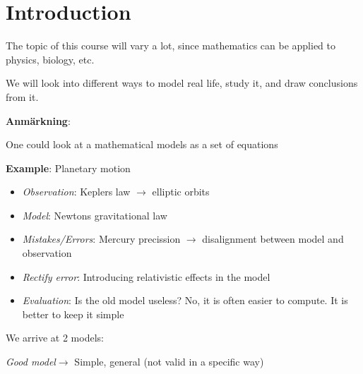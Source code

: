\section{Introduction}\par
\noindent The topic of this course will vary a lot, since mathematics can be applied to physics, biology, etc.\par
\noindent We will look into different ways to model real life, study it, and draw conclusions from it.
\par\bigskip
\noindent\textbf{Anmärkning}:\par
\noindent One could look at a mathematical models as a set of equations
\par\bigskip
\noindent\textbf{Example}: Planetary motion
\begin{itemize}
  \item\textit{Observation}: Keplers law $\rightarrow$ elliptic orbits
  \item\textit{Model}: Newtons gravitational law
  \item\textit{Mistakes/Errors}: Mercury precission $\rightarrow$ disalignment between model and observation
  \item\textit{Rectify error}: Introducing relativistic effects in the model
  \item\textit{Evaluation}: Is the old model useless? No, it is often easier to compute. It is better to keep it simple 
\end{itemize}\par
\noindent We arrive at 2 models:
\begin{center}
  \textit{Good model}$\rightarrow$ Simple, general (not valid in a specific way)
\end{center}
\par\bigskip
\begin{figure}[ht!]
    \centering
    \caption{}
\end{figure}
\par\bigskip
